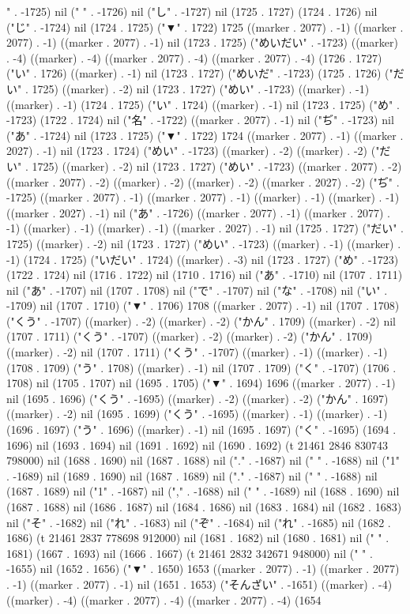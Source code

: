 " . -1725) nil (" " . -1726) nil ("し" . -1727) nil (1725 . 1727) (1724 . 1726) nil ("じ" . -1724) nil (1724 . 1725) ("▼" . 1722) 1725 ((marker . 2077) . -1) ((marker . 2077) . -1) ((marker . 2077) . -1) nil (1723 . 1725) ("めいだい" . -1723) ((marker) . -4) ((marker) . -4) ((marker . 2077) . -4) ((marker . 2077) . -4) (1726 . 1727) ("い" . 1726) ((marker) . -1) nil (1723 . 1727) ("めいだ" . -1723) (1725 . 1726) ("だい" . 1725) ((marker) . -2) nil (1723 . 1727) ("めい" . -1723) ((marker) . -1) ((marker) . -1) (1724 . 1725) ("い" . 1724) ((marker) . -1) nil (1723 . 1725) ("め" . -1723) (1722 . 1724) nil ("名" . -1722) ((marker . 2077) . -1) nil ("ぢ" . -1723) nil ("あ" . -1724) nil (1723 . 1725) ("▼" . 1722) 1724 ((marker . 2077) . -1) ((marker . 2027) . -1) nil (1723 . 1724) ("めい" . -1723) ((marker) . -2) ((marker) . -2) ("だい" . 1725) ((marker) . -2) nil (1723 . 1727) ("めい" . -1723) ((marker . 2077) . -2) ((marker . 2077) . -2) ((marker) . -2) ((marker) . -2) ((marker . 2027) . -2) ("ぢ" . -1725) ((marker . 2077) . -1) ((marker . 2077) . -1) ((marker) . -1) ((marker) . -1) ((marker . 2027) . -1) nil ("あ" . -1726) ((marker . 2077) . -1) ((marker . 2077) . -1) ((marker) . -1) ((marker) . -1) ((marker . 2027) . -1) nil (1725 . 1727) ("だい" . 1725) ((marker) . -2) nil (1723 . 1727) ("めい" . -1723) ((marker) . -1) ((marker) . -1) (1724 . 1725) ("いだい" . 1724) ((marker) . -3) nil (1723 . 1727) ("め" . -1723) (1722 . 1724) nil (1716 . 1722) nil (1710 . 1716) nil ("あ" . -1710) nil (1707 . 1711) nil ("あ" . -1707) nil (1707 . 1708) nil ("で" . -1707) nil ("な" . -1708) nil ("い" . -1709) nil (1707 . 1710) ("▼" . 1706) 1708 ((marker . 2077) . -1) nil (1707 . 1708) ("くう" . -1707) ((marker) . -2) ((marker) . -2) ("かん" . 1709) ((marker) . -2) nil (1707 . 1711) ("くう" . -1707) ((marker) . -2) ((marker) . -2) ("かん" . 1709) ((marker) . -2) nil (1707 . 1711) ("くう" . -1707) ((marker) . -1) ((marker) . -1) (1708 . 1709) ("う" . 1708) ((marker) . -1) nil (1707 . 1709) ("く" . -1707) (1706 . 1708) nil (1705 . 1707) nil (1695 . 1705) ("▼" . 1694) 1696 ((marker . 2077) . -1) nil (1695 . 1696) ("くう" . -1695) ((marker) . -2) ((marker) . -2) ("かん" . 1697) ((marker) . -2) nil (1695 . 1699) ("くう" . -1695) ((marker) . -1) ((marker) . -1) (1696 . 1697) ("う" . 1696) ((marker) . -1) nil (1695 . 1697) ("く" . -1695) (1694 . 1696) nil (1693 . 1694) nil (1691 . 1692) nil (1690 . 1692) (t 21461 2846 830743 798000) nil (1688 . 1690) nil (1687 . 1688) nil ("." . -1687) nil (" " . -1688) nil ("1" . -1689) nil (1689 . 1690) nil (1687 . 1689) nil ("." . -1687) nil (" " . -1688) nil (1687 . 1689) nil ("1" . -1687) nil ("," . -1688) nil (" " . -1689) nil (1688 . 1690) nil (1687 . 1688) nil (1686 . 1687) nil (1684 . 1686) nil (1683 . 1684) nil (1682 . 1683) nil ("そ" . -1682) nil ("れ" . -1683) nil ("ぞ" . -1684) nil ("れ" . -1685) nil (1682 . 1686) (t 21461 2837 778698 912000) nil (1681 . 1682) nil (1680 . 1681) nil (" " . 1681) (1667 . 1693) nil (1666 . 1667) (t 21461 2832 342671 948000) nil (" " . -1655) nil (1652 . 1656) ("▼" . 1650) 1653 ((marker . 2077) . -1) ((marker . 2077) . -1) ((marker . 2077) . -1) nil (1651 . 1653) ("そんざい" . -1651) ((marker) . -4) ((marker) . -4) ((marker . 2077) . -4) ((marker . 2077) . -4) (1654 
